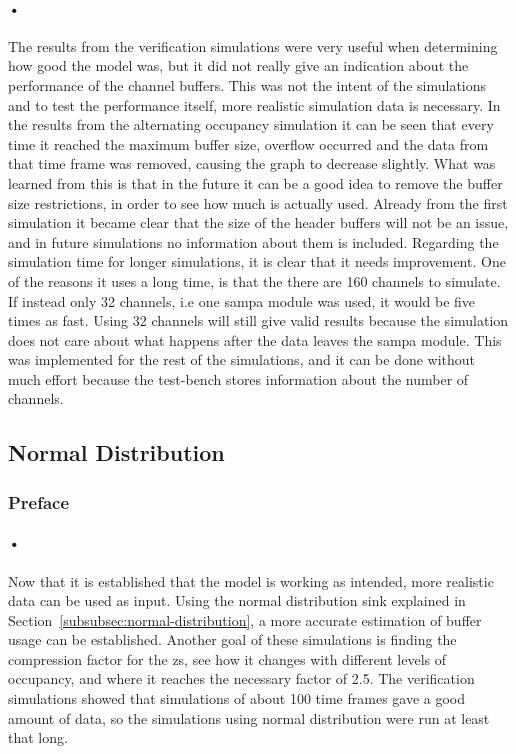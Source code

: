 \documentclass[a4paper, 12pt]{report}
\begin{document}
\paragraph{•}
The results from the verification simulations were very useful when determining how good the model was, but it did not really give an indication about the performance of the channel buffers.
This was not the intent of the simulations and to test the performance itself, more realistic simulation data is necessary.
In the results from the alternating occupancy simulation it can be seen that every time it reached the maximum buffer size, overflow occurred and the data from that time frame was removed, causing the graph to decrease slightly.
What was learned from this is that in the future it can be a good idea to remove the buffer size restrictions, in order to see how much is actually used.
Already from the first simulation it became clear that the size of the header buffers will not be an issue, and in future simulations no information about them is included. 
Regarding the simulation time for longer simulations, it is clear that it needs improvement.
One of the reasons it uses a long time, is that the there are 160 channels to simulate.
If instead only 32 channels, i.e one \gls{sampa} module was used, it would be five times as fast.
Using 32 channels will still give valid results because the simulation does not care about what happens after the data leaves the \gls{sampa} module.
This was implemented for the rest of the simulations, and it can be done without much effort because the test-bench stores information about the number of channels.

\subsection{Normal Distribution}

\subsubsection{Preface}

\paragraph{•}
Now that it is established that the model is working as intended, more realistic data can be used as input.
Using the normal distribution sink explained in Section~\ref{subsubsec:normal-distribution}, a more accurate estimation of buffer usage can be established.
Another goal of these simulations is finding the compression factor for the \gls{zs}, see how it changes with different levels of occupancy, and where it reaches the necessary factor of 2.5.
The verification simulations showed that simulations of about 100 time frames gave a good amount of data, so the simulations using normal distribution were run at least that long.
\end{document}
